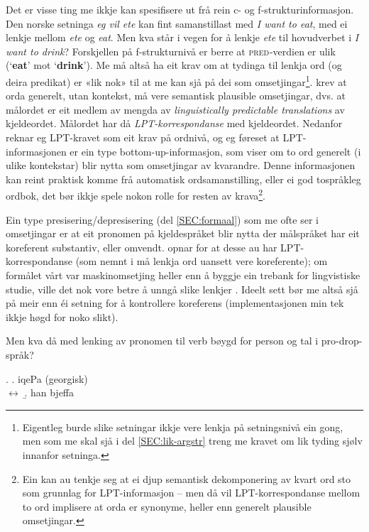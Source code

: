 \documentclass[12pt,a4paper,oneside,draft]{report}
\newcommand{\F}[2]{\textsc{#1}\ensuremath{_{#2}}}
\newcommand{\PRED}{\F{pred}{}}
\newcommand{\p}[1]{`\textbf{#1}'}
\begin{document}
Det er visse ting me ikkje kan spesifisere ut frå rein c- og
 f\hyp{}strukturinformasjon. Den norske setninga \emph{eg vil ete} kan fint
 samanstillast med \emph{I want to eat}, med ei lenkje mellom \emph{ete} og
 \emph{eat}. Men kva står i vegen for å lenkje \emph{ete} til hovudverbet i \emph{I  want to drink}? Forskjellen på f\hyp{}strukturnivå er berre at
 \PRED{}-verdien er ulik (\p{eat} mot \p{drink}). Me må altså ha eit krav
 om at tydinga til lenkja ord (og deira predikat) er «lik nok» til at
 me kan sjå på dei som omsetjingar\footnote{Eigentleg burde slike setningar ikkje vere lenkja på
        setningsnivå ein gong, men som me skal sjå i del
        \ref{SEC:lik-argstr} treng me kravet om lik tyding 
        sjølv innanfor setninga. }. \citet[s.~74]{dyvik2009lmp}
 krev at orda generelt, utan kontekst, må vere semantisk plausible
 omsetjingar, dvs. at målordet er eit medlem av mengda av
 \emph{linguistically predictable translations} av kjeldeordet. Målordet
 har då \emph{LPT\hyp{}korrespondanse} med kjeldeordet.  Nedanfor reknar eg
 LPT-kravet som eit krav på ordnivå, og eg føreset at
 LPT\hyp{}informasjonen er ein type bottom-up-informasjon, som viser om to
 ord generelt (i ulike kontekstar) blir nytta som omsetjingar av
 kvarandre. Denne informasjonen kan reint praktisk komme frå
 automatisk ordsamanstilling, eller ei god tospråkleg ordbok, det bør
 ikkje spele nokon rolle for resten av krava\footnote{Ein kan au tenkje seg at ei djup semantisk dekomponering av
        kvart ord sto som grunnlag for LPT\hyp{}informasjon -- men då vil
        LPT\hyp{}korrespondanse mellom to ord implisere at orda er
        synonyme, heller enn generelt plausible omsetjingar. }.

Ein type presisering/depresisering (del \ref{SEC:formaal}) som me ofte
 ser i omsetjingar er at eit pronomen på kjeldespråket blir nytta der
 målspråket har eit koreferent substantiv, eller
 omvendt. \citet{dyvik2009lmp} opnar for at desse au har
 LPT\hyp{}korrespondanse (som nemnt i \cite{thunes2003eal} må lenkja
 ord uansett vere koreferente); om formålet vårt var maskinomsetjing
 heller enn å byggje ein trebank for lingvistiske studie, ville det
 nok vore betre å unngå slike lenkjer
 \citep[s.~53]{volk2008hjp}. Ideelt sett bør me altså sjå på meir enn
 éi setning for å kontrollere koreferens (implementasjonen min tek
 ikkje høgd for noko slikt).

Men kva då med lenking av pronomen til verb bøygd for person og tal i
pro-drop-språk?

\ex. \a. iqePa                                  \hfill{} (georgisk) \\
     $\leftrightarrow$
     \b. han bjeffa
\end{document}
